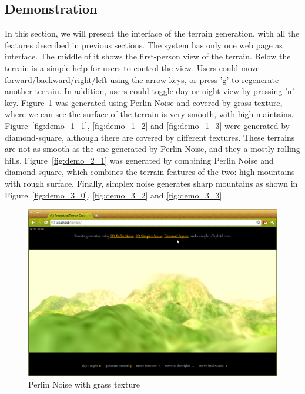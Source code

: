 \subsection{Demonstration}
In this section, we will present the interface of the terrain generation, with all the features described in previous sections. The system has only one web page as interface. The middle of it shows the first-person view of the terrain. Below the terrain is a simple help for users to control the view. Users could move forward/backward/right/left using the arrow keys, or press 'g' to regenerate another terrain. In addition, users could toggle day or night view by pressing 'n' key. Figure~\ref{fig:demo_0_1} was generated using Perlin Noise and covered by grass texture, where we can see the surface of the terrain is very smooth, with high maintains. Figure~\ref{fig:demo_1_1}, \ref{fig:demo_1_2} and \ref{fig:demo_1_3} were generated by diamond-square, although there are covered by different textures. These terrains are not as smooth as the one generated by Perlin Noise, and they a mostly rolling hills. Figure~\ref{fig:demo_2_1} was generated by combining Perlin Noise and diamond-square, which combines the terrain features of the two: high mountains with rough surface. Finally, simplex noise generates sharp mountains as shown in Figure~\ref{fig:demo_3_0}, \ref{fig:demo_3_2} and \ref{fig:demo_3_3}.
\begin{figure}
	\center
	\includegraphics[scale=0.4]{images/demo_0_1.png}
	\caption{Perlin Noise with grass texture}
	\label{fig:demo_0_1}
\end{figure}
